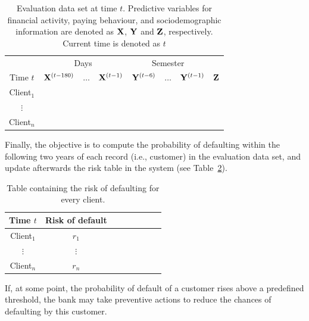 \begin{itemize}
\begin{table}[htbp]
\centering
\begin{tabular}{c|ccc|ccc|c}
	&\multicolumn{3}{c|}{Days} & \multicolumn{3}{c|}{Semester} \\
     Time $t$              & $\mathbf{X}^{(t-180)}$ & $\ldots$ & $\mathbf{X}^{(t-1)} $ & $\mathbf{Y}^{(t-6)}$  & $\ldots$ & $\mathbf{Y}^{(t-1)} $ & $\mathbf{Z}$  \\  
\hline
Client$_1$  &                                                  &              &                     &                               &                     &        \\ 
$\vdots$      &                                                 &               &                     &                                &                     &      \\ 
Client$_n$  &                                                &               &                     &                                &                     &     \\ 
\end{tabular}
\caption{Evaluation data set at time $t$. Predictive variables for financial activity, paying behaviour, and sociodemographic information are denoted as $\mathbf{X}$, $\mathbf{Y}$ and $\mathbf{Z}$, respectively. Current time is denoted as $t$}
\label{tab:EvaluationDataset} 
\end{table}

Finally, the objective is to compute the probability of defaulting within the following two years of each record (i.e., customer) in the evaluation data set, and update afterwards the risk table in the system (see Table~\ref{tab:riskTable}).

\begin{table}[h]
\centering
\begin{tabular}{c|ccc|ccc|c}
     Time $t$  & Risk of default \\  
\hline
Client$_1$  &    $r_1$  \\ 
$\vdots$      &   $\vdots$   \\ 
Client$_n$  &   $r_n$  \\ 
\end{tabular} 
\caption{Table containing the risk of defaulting for every client.}
\label{tab:riskTable}
\end{table}

If, at some point, the probability of default of a customer rises above a predefined threshold, the bank may take preventive actions to reduce the chances of defaulting by this customer.



\end{itemize}
